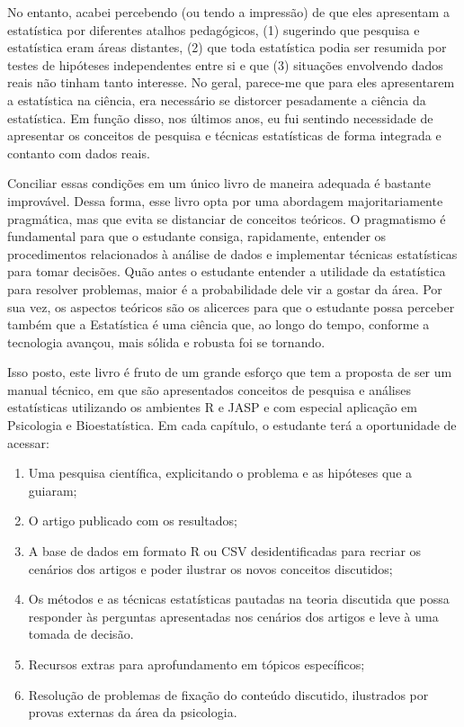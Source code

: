 \documentclass[
]{book}
\providecommand{\tightlist}{%
  \setlength{\itemsep}{0pt}\setlength{\parskip}{0pt}}
\begin{document}
No entanto, acabei percebendo (ou tendo a impressão) de que eles apresentam a estatística por diferentes atalhos pedagógicos, (1) sugerindo que pesquisa e estatística eram áreas distantes, (2) que toda estatística podia ser resumida por testes de hipóteses independentes entre si e que (3) situações envolvendo dados reais não tinham tanto interesse. No geral, parece-me que para eles apresentarem a estatística na ciência, era necessário se distorcer pesadamente a ciência da estatística. Em função disso, nos últimos anos, eu fui sentindo necessidade de apresentar os conceitos de pesquisa e técnicas estatísticas de forma integrada e contanto com dados reais.

Conciliar essas condições em um único livro de maneira adequada é bastante improvável. Dessa forma, esse livro opta por uma abordagem majoritariamente pragmática, mas que evita se distanciar de conceitos teóricos. O pragmatismo é fundamental para que o estudante consiga, rapidamente, entender os procedimentos relacionados à análise de dados e implementar técnicas estatísticas para tomar decisões. Quão antes o estudante entender a utilidade da estatística para resolver problemas, maior é a probabilidade dele vir a gostar da área. Por sua vez, os aspectos teóricos são os alicerces para que o estudante possa perceber também que a Estatística é uma ciência que, ao longo do tempo, conforme a tecnologia avançou, mais sólida e robusta foi se tornando.

Isso posto, este livro é fruto de um grande esforço que tem a proposta de ser um manual técnico, em que são apresentados conceitos de pesquisa e análises estatísticas utilizando os ambientes R e JASP e com especial aplicação em Psicologia e Bioestatística. Em cada capítulo, o estudante terá a oportunidade de acessar:

\begin{enumerate}
\def\labelenumi{\arabic{enumi}.}
\tightlist
\item
  Uma pesquisa científica, explicitando o problema e as hipóteses que a guiaram;\\
\item
  O artigo publicado com os resultados;\\
\item
  A base de dados em formato R ou CSV desidentificadas para recriar os cenários dos artigos e poder ilustrar os novos conceitos discutidos;\\
\item
  Os métodos e as técnicas estatísticas pautadas na teoria discutida que possa responder às perguntas apresentadas nos cenários dos artigos e leve à uma tomada de decisão.\\
\item
  Recursos extras para aprofundamento em tópicos específicos;\\
\item
  Resolução de problemas de fixação do conteúdo discutido, ilustrados por provas externas da área da psicologia.
\end{enumerate}
\end{document}
